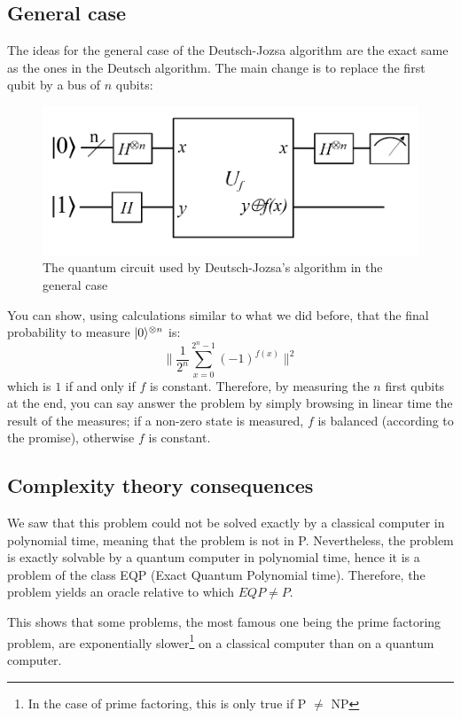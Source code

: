 \documentclass[12pt,a4paper]{article}
\theoremstyle{plain}
\theoremstyle{definition}
\DeclarePairedDelimiter\ket{\lvert}{\rangle}
\begin{document}
\subsection{General case}
The ideas for the general case of the Deutsch-Jozsa algorithm are the exact same as the ones in the Deutsch algorithm. The main change is to replace the first qubit by a bus of $n$ qubits:

\begin{figure}[!ht]
    \centering
    \includegraphics*[scale=0.4]{deutsch-circuit-n.png}
    \caption{The quantum circuit used by Deutsch-Jozsa's algorithm in the general case}
\end{figure}

You can show, using calculations similar to what we did before, that the final probability to measure $\ket{0}^{\otimes n}$ is:
\begin{equation*}
    \|\frac{1}{2^n}\sum_{x=0}^{2^n-1}(-1)^{f(x)}\|^2
\end{equation*}
which is $1$ if and only if $f$ is constant.
Therefore, by measuring the $n$ first qubits at the end, you can say answer the problem by simply browsing in linear time the result of the measures; if a non-zero state is measured, $f$ is balanced (according to the promise), otherwise $f$ is constant.


\subsection{Complexity theory consequences}
We saw that this problem could not be solved exactly by a classical computer in polynomial time, meaning that the problem is not in P. Nevertheless, the problem is exactly solvable by a quantum computer in polynomial time, hence it is a problem of the class EQP (Exact Quantum Polynomial time). Therefore, the problem yields an oracle relative to which $EQP \neq P$.

This shows that some problems, the most famous one being the prime factoring problem, are exponentially slower\footnote{In the case of prime factoring, this is only true if P $\neq$ NP} on a classical computer than on a quantum computer.
\end{document}
